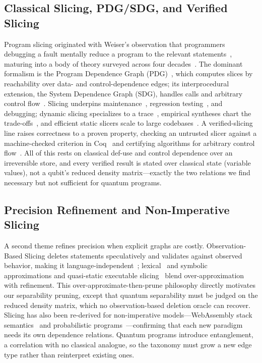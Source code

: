 \documentclass[10pt,conference]{IEEEtran}
\theoremstyle{definition}
\begin{document}
\subsection{Classical Slicing, PDG/SDG, and Verified Slicing}
Program slicing originated with Weiser's observation that programmers debugging a fault mentally reduce a program to the relevant statements~\cite{weiser1982programmers}, maturing into a body of theory surveyed across four decades~\cite{tip1994a, xu2005brief, silva2012vocabulary, gallagher2025program}. The dominant formalism is the Program Dependence Graph (PDG)~\cite{ferrante1987pdg}, which computes slices by reachability over data- and control-dependence edges; its interprocedural extension, the System Dependence Graph (SDG), handles calls and arbitrary control flow~\cite{horwitz1990interprocedural, sinha1999sdg}. Slicing underpins maintenance~\cite{gallagher1991using}, regression testing~\cite{binkley1998the}, and debugging; dynamic slicing specializes to a trace~\cite{agrawal1990dynamic}, empirical syntheses chart the trade-offs~\cite{binkley2004a, harman2008program}, and efficient static slicers scale to large codebases~\cite{alomari2014srcslice}. A verified-slicing line raises correctness to a proven property, checking an untrusted slicer against a machine-checked criterion in Coq~\cite{blazy2015verified} and certifying algorithms for arbitrary control flow~\cite{léchenet2018certified, aparna2026formal}. All of this rests on classical def-use and control dependence over an irreversible store, and every verified result is stated over classical state (variable values), not a qubit's reduced density matrix---exactly the two relations we find necessary but not sufficient for quantum programs.

\subsection{Precision Refinement and Non-Imperative Slicing}
A second theme refines precision when explicit graphs are costly. Observation-Based Slicing deletes statements speculatively and validates against observed behavior, making it language-independent~\cite{binkley2014orbs, binkley2015orbs, binkley2022assessing}; lexical~\cite{lee2020evaluating} and symbolic~\cite{zhang2019sympas} approximations and quasi-static executable slicing~\cite{stiévenart2021qses, stiévenart2023an} blend over-approximation with refinement. This over-approximate-then-prune philosophy directly motivates our separability pruning, except that quantum separability must be judged on the reduced density matrix, which no observation-based deletion oracle can recover. Slicing has also been re-derived for non-imperative models---WebAssembly stack semantics~\cite{stievenart2022static, stievenart2023dynamic, stievenart2025an, choi2026stackbased} and probabilistic programs~\cite{olmedo2025slicing}---confirming that each new paradigm needs its own dependence relations. Quantum programs introduce entanglement, a correlation with no classical analogue, so the taxonomy must grow a new edge type rather than reinterpret existing ones.
\end{document}
